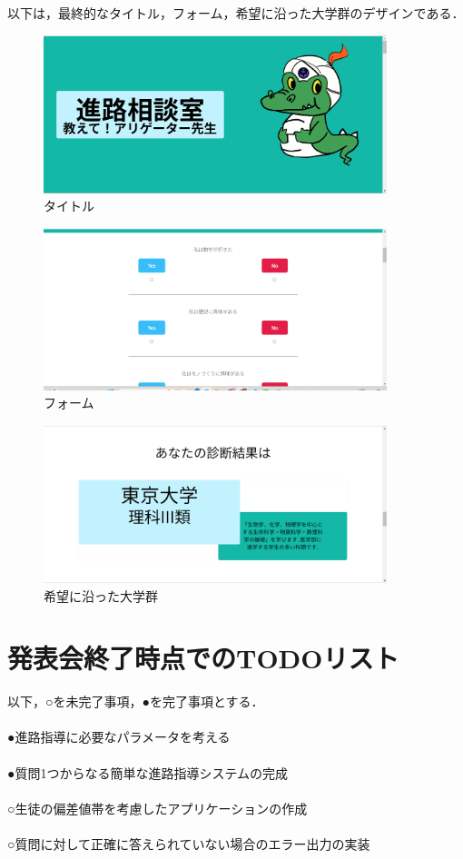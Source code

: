 \documentclass[a4j, titlepage]{jarticle}
\begin{document}
以下は，最終的なタイトル，フォーム，希望に沿った大学群のデザインである．
\begin{figure}[htbp]
  \begin{center}
  \includegraphics[width=100mm]{title.png}
  \caption{タイトル}
  \end{center}
\end{figure}
\begin{figure}[htbp]
  \begin{center}
  \includegraphics[width=100mm]{form2.png}
  \caption{フォーム}
  \end{center}
\end{figure}
\begin{figure}[htbp]
  \begin{center}
  \includegraphics[width=100mm]{univs2.png}
  \caption{希望に沿った大学群}
  \end{center}
\end{figure}
\section{発表会終了時点でのTODOリスト}
以下，○を未完了事項，●を完了事項とする．\\
\\
●進路指導に必要なパラメータを考える\\
\\
●質問1つからなる簡単な進路指導システムの完成\\
\\
○生徒の偏差値帯を考慮したアプリケーションの作成\\
\\
○質問に対して正確に答えられていない場合のエラー出力の実装\\
\end{document}
